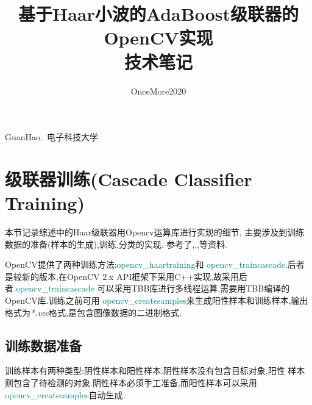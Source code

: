 \documentclass[10pt,technote]{IEEEtran}
\begin{document}
\title{基于Haar小波的AdaBoost级联器的OpenCV实现\\技术笔记}
\author{OnceMore2020}

%
{GuanHao.~电子科技大学}


\maketitle
\IEEEdisplaynontitleabstractindextext
\section{级联器训练(Cascade Classifier Training)}
本节记录综述\cite{bib1}中的Haar级联器用Opencv运算库进行实现的细节,
主要涉及到训练数据的准备(样本的生成),训练,分类的实现.
参考了\cite{bib2},\cite{bib3},\cite{bib4},\cite{bib5}等资料.

OpenCV提供了两种训练方法:\textcolor{teal}{opencv\_haartraining}和
\textcolor{teal}{opencv\_traincascade}.后者是较新的版本,在OpenCV 2.x
API框架下采用C++实现,故采用后者.\textcolor{teal}{opencv\_traincascade}
可以采用TBB库进行多线程运算,需要用TBB编译的OpenCV库.训练之前可用
\textcolor{teal}{opencv\_createsamples}来生成阳性样本和训练样本,输出
格式为\textit{*.vec}格式,是包含图像数据的二进制格式.
\subsection{训练数据准备}
训练样本有两种类型:阴性样本和阳性样本.阴性样本没有包含目标对象,阳性
样本则包含了待检测的对象.阴性样本必须手工准备,而阳性样本可以采用
\textcolor{teal}{opencv\_createsamples}自动生成.
\end{document}
